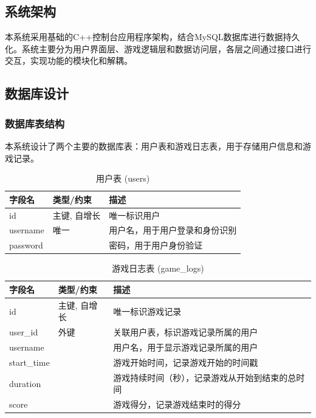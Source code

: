 \documentclass{article}
\begin{document}
\subsection{系统架构}
本系统采用基础的C++控制台应用程序架构，结合MySQL数据库进行数据持久化。系统主要分为用户界面层、游戏逻辑层和数据访问层，各层之间通过接口进行交互，实现功能的模块化和解耦。

\subsection{数据库设计}

\subsubsection{数据库表结构}
本系统设计了两个主要的数据库表：用户表和游戏日志表，用于存储用户信息和游戏记录。

\begin{table}[h!]
\centering
\caption{用户表 (users)}
\begin{tabular}{lll}
\toprule
\textbf{字段名} & \textbf{类型/约束} & \textbf{描述} \\
\midrule
id & 主键, 自增长 & 唯一标识用户 \\
username & 唯一 & 用户名，用于用户登录和身份识别 \\
password &  & 密码，用于用户身份验证 \\
\bottomrule
\end{tabular}
\label{tab:users_table}
\end{table}

\begin{table}[h!]
\centering
\caption{游戏日志表 (game\_logs)}
\begin{tabular}{lll}
\toprule
\textbf{字段名} & \textbf{类型/约束} & \textbf{描述} \\
\midrule
id & 主键, 自增长 & 唯一标识游戏记录 \\
user\_id & 外键 & 关联用户表，标识游戏记录所属的用户 \\
username &  & 用户名，用于显示游戏记录所属的用户 \\
start\_time &  & 游戏开始时间，记录游戏开始的时间戳 \\
duration &  & 游戏持续时间（秒），记录游戏从开始到结束的总时间 \\
score &  & 游戏得分，记录游戏结束时的得分 \\
\bottomrule
\end{tabular}
\label{tab:game_logs_table}
\end{table}
\end{document}
